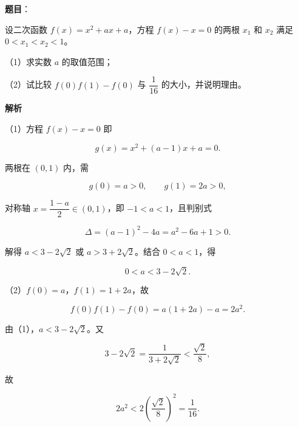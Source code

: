 \begin{answer}

\textbf{题目}：

设二次函数 $f(x)=x^2+ax+a$，方程 $f(x)-x=0$ 的两根 $x_1$ 和 $x_2$ 满足 $0<x_1<x_2<1$。

（1）求实数 $a$ 的取值范围；

（2）试比较 $f(0)f(1)-f(0)$ 与 $\dfrac1{16}$ 的大小，并说明理由。

\textbf{解析}

（1）方程 $f(x)-x=0$ 即

\nopagebreak[4]
\[g(x)=x^2+(a-1)x+a=0.\]

两根在 $(0,1)$ 内，需

\nopagebreak[4]
\[g(0)=a>0,\qquad g(1)=2a>0,\]

对称轴 $x=\dfrac{1-a}{2}\in(0,1)$，即 $-1<a<1$，且判别式

\nopagebreak[4]
\[\Delta=(a-1)^2-4a=a^2-6a+1>0.\]

解得 $a<3-2\sqrt2$ 或 $a>3+2\sqrt2$。结合 $0<a<1$，得

\nopagebreak[4]
\[0<a<3-2\sqrt2.\]

（2）$f(0)=a$，$f(1)=1+2a$，故

\nopagebreak[4]
\[f(0)f(1)-f(0)=a(1+2a)-a=2a^2.\]

由（1），$a<3-2\sqrt2$。又

\nopagebreak[4]
\[3-2\sqrt2=\frac1{3+2\sqrt2}<\frac{\sqrt2}{8},\]

故

\nopagebreak[4]
\[2a^2<2\left(\frac{\sqrt2}{8}\right)^2=\frac1{16}.\]


\end{answer}
